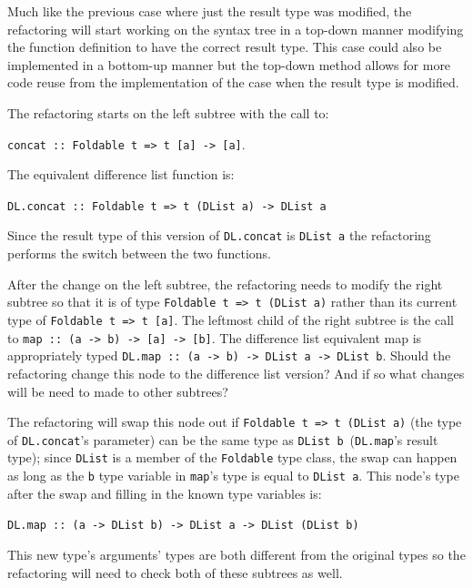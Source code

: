 Much like the previous case where just the result type was modified, the refactoring will start working on the syntax tree in a top-down manner modifying the function definition to have the correct result type. This case could also be implemented in a bottom-up manner but the top-down method allows for more code reuse from the implementation of the case when the result type is modified.

The refactoring starts on the left subtree with the call to: 

\texttt{concat :: Foldable t => t [a] -> [a]}. 

The equivalent difference list function is: 

\texttt{DL.concat :: Foldable t => t (DList a) -> DList a} 

Since the result type of this version of \texttt{DL.concat} is \texttt{DList a} the refactoring performs the switch between the two functions. 

After the change on the left subtree, the refactoring needs to modify the right subtree so that it is of type \texttt{Foldable t => t (DList a)} rather than its current type of \texttt{Foldable t => t [a]}. The leftmost child of the right subtree is the call to \texttt{map :: (a -> b) -> [a] -> [b]}. The difference list equivalent map is appropriately typed \texttt{DL.map :: (a -> b) -> DList a -> DList b}. Should the refactoring change this node to the difference list version? And if so what changes will be need to made to other subtrees?

The refactoring will swap this node out if \texttt{Foldable t => t (DList a)} (the type of \texttt{DL.concat}'s parameter) can be the same type as \texttt{DList b}~(\texttt{DL.map}'s result type); since \texttt{DList} is a member of the \texttt{Foldable} type class, the swap can happen as long as the \texttt{b} type variable in \texttt{map}'s type is equal to \texttt{DList a}. This node's type after the swap and filling in the known type variables is: 

\texttt{DL.map :: (a -> DList b) -> DList a -> DList (DList b)}

This new type's arguments' types are both different from the original types so the refactoring will need to check both of these subtrees as well. 

